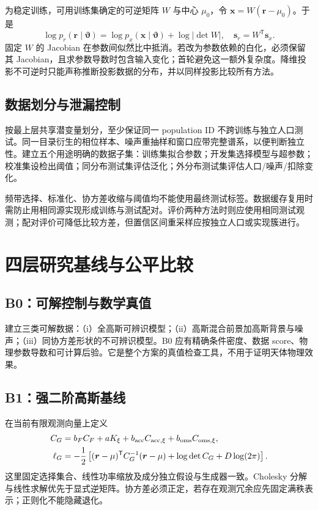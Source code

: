 \documentclass[UTF8,fontset=fandol,a4paper,11pt]{ctexart}
\numberwithin{equation}{section}
\newcommand{\btheta}{\boldsymbol\vartheta}
\newcommand{\bs}{\boldsymbol s}
\newcommand{\br}{\boldsymbol r}
\newcommand{\bx}{\boldsymbol x}
\begin{document}
为稳定训练，可用训练集确定的可逆矩阵 $W$ 与中心 $\mu_0$，令 $\bx=W(\br-\mu_0)$。于是
\begin{equation}
\log p_r(\br\mid\btheta)=\log p_x(\bx\mid\btheta)+\log|\det W|,
\quad \bs_r=W^{\mathsf T}\bs_x.
\end{equation}
固定 $W$ 的 Jacobian 在参数间似然比中抵消。若改为参数依赖的白化，必须保留其 Jacobian，且求参数导数时包含输入变化；首轮避免这一额外复杂度。降维投影不可逆时只能声称推断投影数据的分布，并以同样投影比较所有方法。

\subsection{数据划分与泄漏控制}
按最上层共享潜变量划分，至少保证同一 population ID 不跨训练与独立人口测试。同一目录衍生的相位样本、噪声重抽样和窗口应带完整谱系，以便判断独立性。建立五个用途明确的数据子集：训练集拟合参数；开发集选择模型与超参数；校准集设检出阈值；同分布测试集评估泛化；外分布测试集评估人口/噪声/扣除变化。

频带选择、标准化、协方差收缩与阈值均不能使用最终测试标签。数据缓存复用时需防止用相同源实现形成训练与测试配对。评价两种方法时则应使用相同测试观测；配对评价可降低比较方差，但置信区间重采样应按独立人口或实现簇进行。

\section{四层研究基线与公平比较}
\subsection{B0：可解控制与数学真值}
建立三类可解数据：（i）全高斯可辨识模型；（ii）高斯混合前景加高斯背景与噪声；（iii）同协方差形状的不可辨识模型。B0 应有精确条件密度、数据 score、物理参数导数和可计算后验。它是整个方案的真值检查工具，不用于证明天体物理效果。

\subsection{B1：强二阶高斯基线}
在当前有限观测向量上定义
\begin{align}
C_G&=b_FC_F+aK_\xi+b_{\rm acc}C_{{\rm acc},\xi}
+b_{\rm oms}C_{{\rm oms},\xi},\\
\ell_G&=-\frac12\left[(\br-\mu)^{\mathsf T}C_G^{-1}(\br-\mu)
+\log\det C_G+D\log(2\pi)\right].
\end{align}
这里固定选择集合、线性功率缩放及成分独立假设与生成器一致。Cholesky 分解与线性求解优先于显式逆矩阵。协方差必须正定，若存在观测冗余应先固定满秩表示；正则化不能隐藏退化。
\end{document}
